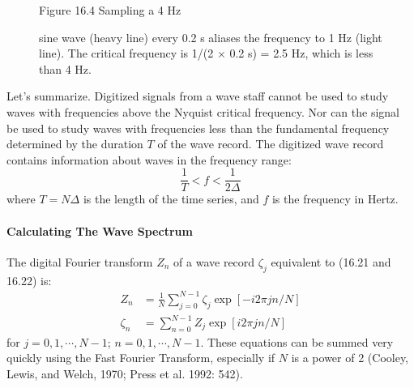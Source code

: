 \begin{figure}[t!]
\footnotesize
\centering
Figure 16.4 Sampling a 4 Hz \rule{0mm}{4ex}sine wave (heavy line)
every 0.2 s aliases the frequency to 1 Hz (light line). The critical
frequency is 1/(2 $\times$ 0.2 s) = 2.5 Hz, which is less than 4 Hz.

\label{fig:aliasplot}
\vspace{-3ex}
\end{figure}

Let's summarize. Digitized signals from a wave staff cannot be used to
study waves with frequencies above the Nyquist critical frequency. Nor
can the signal be used to study waves with frequencies less than the
fundamental frequency determined by the duration $T$ of the wave
record. The digitized wave record contains information about waves in
the frequency range:
\begin{equation}
\frac{1}{T} < f < \frac{1}{2 \Delta}
\end{equation}
where $T = N \Delta $ is the length of the time series, and $f$ is the
frequency in Hertz.

\paragraph{Calculating The Wave Spectrum}
The digital Fourier transform $Z_n$
of a wave record $\zeta _j$ equivalent to (16.21 and 16.22) is:
\begin{subequations}
\begin{align}
Z_{n} &= \frac{1}{N} \sum_{j=0}^{N-1} \zeta_{j} \exp [-i2 \pi j n /N] \\
\zeta_{n} &= \sum_{n=0}^{N-1} Z_{j} \exp [i 2 \pi j n /N]
\end{align}
\end{subequations}
for $j=0,1,\cdots, N-1$; $n= 0, 1, \cdots , N-1$. These equations can
be summed very quickly using the Fast Fourier Transform, especially if
$N$ is a power of 2 (Cooley, Lewis, and Welch, 1970; Press et
al. 1992: 542).

